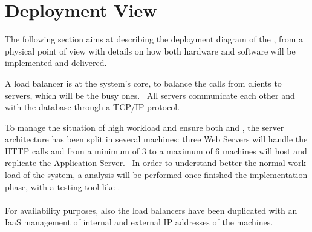 \documentclass[../../DD.tex]{subfiles}
\begin{document}
\section{Deployment View\label{sect:2.3}}

The following section aims at describing the deployment diagram of the , from a physical point of view with details on how both hardware and software will be implemented and delivered.


A load balancer is at the system's core, to balance the calls from clients to servers, which will be the busy ones. \ All servers communicate each other and with the database through a TCP/IP protocol.

To manage the situation of high workload and ensure both  and , the server architecture has been split in several machines: three Web Servers will handle the HTTP calls and from a minimum of 3 to a maximum of 6 machines will host and replicate the Application Server. \
In order to understand better the normal work load of the system, a  analysis will be performed once finished the implementation phase, with a testing tool like . \\\\
For availability purposes, also the load balancers have been duplicated with an IaaS management of internal and external IP addresses of the machines. \\\\

\newpage
\end{document}
